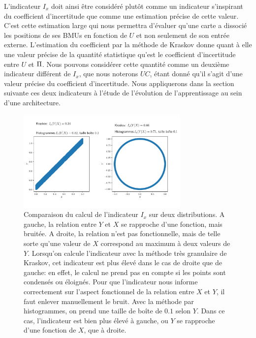 L'indicateur $I_x$ doit ainsi être considéré plutôt comme un indicateur s'inspirant du coefficient d'incertitude que comme une estimation précise de cette valeur. 
C'est cette estimation large qui nous permettra d'évaluer qu'une carte a dissocié les positions de ses BMUs en fonction de $U$ et non seulement de son entrée externe.
L'estimation du coefficient par la méthode de Kraskov donne quant à elle une valeur précise de la quantité statistique qu'est le coefficient d'incertitude entre $U$ et $\Pi$.
Nous pouvons considérer cette quantité comme un deuxième indicateur différent de $I_x$, que nous noterons $UC$, étant donné qu'il s'agit d'une valeur précise du coefficient d'incertitude. 
Nous appliquerons dans la section suivante ces deux indicateurs à l'étude de l'évolution de l'apprentissage au sein d'une architecture.

\begin{figure}
    \centering
    \includegraphics[width=0.75\textwidth]{comparaison_binning_kraskov.pdf}
    \caption{Comparaison du calcul de l'indicateur $I_x$ sur deux distributions. A gauche, la relation entre $Y$ et $X$ se rapproche d'une fonction, mais bruitée. A droite, la relation n'est pas fonctionnelle, mais de telle sorte qu'une valeur de $X$ correspond au maximum à deux valeurs de $Y$. Lorsqu'on calcule l'indicateur avec la méthode très granulaire de Kraskov, cet indicateur est plus élevé dans le cas de droite que de gauche: en effet, le calcul ne prend pas en compte si les points sont condensés ou éloignés. Pour que l'indicateur nous informe correctement sur l'aspect fonctionnel de la relation entre $X$ et $Y$, il faut enlever manuellement le bruit. Avec la méthode par histogrammes, on prend une taille de boîte de $0.1$ selon $Y$. Dans ce cas, l'indicateur est bien plus élevé à gauche, ou $Y$ se rapproche d'une fonction de $X$, que à droite.}
    \label{fig:exemple-limite}
    \end{figure}


